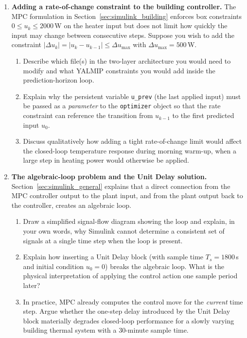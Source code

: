 \begin{enumerate}
	\item \textbf{Adding a rate-of-change constraint to the building
	controller.}
	The MPC formulation in Section~\ref{sec:simulink_building} enforces box
	constraints $0 \le u_k \le 2000$\,W on the heater input but does not
	limit how quickly the input may change between consecutive steps.
	Suppose you wish to add the constraint
	$|\Delta u_k| = |u_k - u_{k-1}| \le \Delta u_{\max}$
	with $\Delta u_{\max} = 500$\,W.
	\begin{enumerate}
		\item Describe which file(s) in the two-layer architecture you would
		      need to modify and what YALMIP constraints you would add inside
		      the prediction-horizon loop.
		\item Explain why the persistent variable \texttt{u\_prev} (the last
		      applied input) must be passed as a \emph{parameter} to the
		      \texttt{optimizer} object so that the rate constraint can
		      reference the transition from $u_{k-1}$ to the first predicted
		      input $u_0$.
		\item Discuss qualitatively how adding a tight rate-of-change limit
		      would affect the closed-loop temperature response during
		      morning warm-up, when a large step in heating power would
		      otherwise be applied.
	\end{enumerate}

	\item \textbf{The algebraic-loop problem and the Unit Delay solution.}
	Section~\ref{sec:simulink_general} explains that a direct connection
	from the MPC controller output to the plant input, and from the plant
	output back to the controller, creates an algebraic loop.
	\begin{enumerate}
		\item Draw a simplified signal-flow diagram showing the loop and
		      explain, in your own words, why Simulink cannot determine a
		      consistent set of signals at a single time step when the loop
		      is present.
		\item Explain how inserting a Unit Delay block (with sample time
		      $T_s = 1800$\,s and initial condition $u_0 = 0$) breaks the
		      algebraic loop.  What is the physical interpretation of
		      applying the control action one sample period later?
		\item In practice, MPC already computes the control move for the
		      \emph{current} time step.  Argue whether the one-step delay
		      introduced by the Unit Delay block materially degrades
		      closed-loop performance for a slowly varying building thermal
		      system with a 30-minute sample time.
	\end{enumerate}


\end{enumerate}
